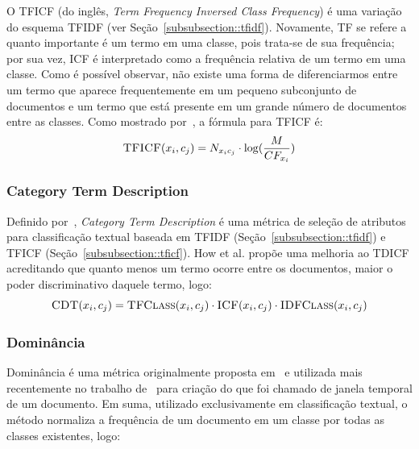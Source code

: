 O TFICF (do inglês, \textit{Term Frequency Inversed Class Frequency}) é uma variação do esquema TFIDF (ver Seção~\ref{subsubsection::tfidf}). Novamente, TF se refere a quanto importante é um termo em uma classe, pois trata-se de sua frequência; por sua vez, ICF é interpretado como a frequência relativa de um termo em uma classe. Como é possível observar, não existe uma forma de diferenciarmos entre um termo que aparece frequentemente em um pequeno subconjunto de documentos e um termo que está presente em um grande número de documentos entre as classes. Como mostrado por~\cite{ChihHow04}, a fórmula para TFICF é:
\begin{equation}\label{eqn::tficf}
 \textsc{TFICF}(x_i, c_j) = N_{x_ic_j} \cdot \log( \frac{M}{CF_{x_i}} )
\end{equation}

\subsubsection{Category Term Description}
\label{subsubsection::ctd}

Definido por~\cite{ChihHow04}, \textit{Category Term Description} é uma métrica de seleção de atributos para classificação textual baseada em \textsc{TFIDF} (Seção~\ref{subsubsection::tfidf}) e \textsc{TFICF} (Seção~\ref{subsubsection::tficf}). How et al. propõe uma melhoria ao TDICF acreditando que quanto menos um termo ocorre entre os documentos, maior o poder discriminativo daquele termo, logo:
\begin{equation}\label{eqn::cdt}
 \textsc{CDT}(x_i, c_j) = \textsc{TFClass}(x_i, c_j) \cdot \textsc{ICF}(x_i, c_j) \cdot \textsc{IDFClass}(x_i,c_j)
\end{equation}

\subsubsection{Dominância}
\label{subsubsection::dom}

Dominância é uma métrica originalmente proposta em~\cite{Zaiane02} e utilizada mais recentemente no trabalho de~\cite{Rocha08} para criação do que foi chamado de janela temporal de um documento. Em suma, utilizado exclusivamente em classificação textual, o método normaliza a frequência de um documento em um classe por todas as classes existentes, logo:

